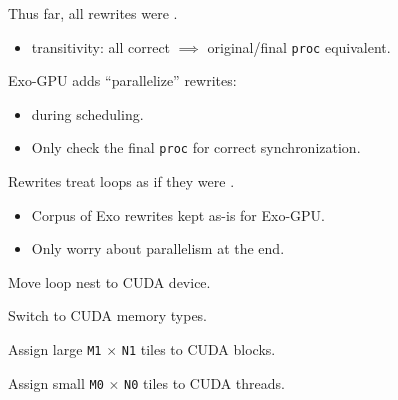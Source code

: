 \newpage
{}

{\LARGE
Thus far, %
all rewrites were .
\begin{itemize}
  \item transitivity: all correct $\implies$ original/final \texttt{proc} equivalent.
\end{itemize}

Exo-GPU adds ``parallelize'' rewrites:
\begin{itemize}
  \item {} during scheduling.
  \item Only check the final \texttt{proc} for correct synchronization.
\end{itemize}

Rewrites treat  loops as if they were .
\begin{itemize}
  \item Corpus of Exo rewrites kept as-is for Exo-GPU.
  \item Only worry about parallelism at the end.
\end{itemize}
}

\newpage
{}

{\large

}

{\LARGE
Move loop nest to CUDA device.

Switch to CUDA memory types.

}

\newpage
{}

{\large

}

{\LARGE
Assign large \texttt{M1} $\times$ \texttt{N1} tiles to CUDA blocks.

}



\newpage
{}

{\large

}

{\LARGE
Assign small \texttt{M0} $\times$ \texttt{N0} tiles to CUDA threads.

}

